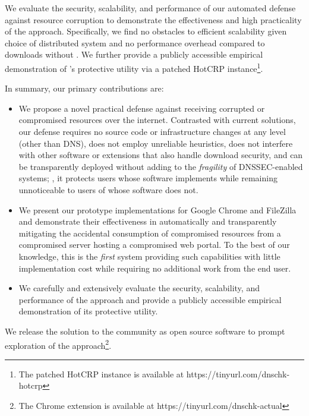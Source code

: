 We evaluate the security, scalability, and performance of our automated defense
against resource corruption to demonstrate the effectiveness and high
practicality of the \SYSTEM{} approach. Specifically, we find no obstacles to
efficient scalability given choice of distributed system and no performance
overhead compared to downloads without \SYSTEM{}. We further provide a publicly
accessible empirical demonstration of \SYSTEM{}'s protective utility via a
patched HotCRP instance\footnote{The patched HotCRP instance is available at
https://tinyurl.com/dnschk-hotcrp}.

In summary, our primary contributions are:

\begin{itemize}

  \item We propose a novel practical defense against receiving corrupted or
  compromised resources over the internet. Contrasted with current solutions,
  our defense requires no source code or infrastructure changes at any level
  (other than DNS), does not employ unreliable heuristics, does not interfere
  with other software or extensions that also handle download security, and can
  be transparently deployed without adding to the \textit{fragility} of
  DNSSEC-enabled systems; \ie, it protects users whose software implements
  \SYSTEM{} while remaining unnoticeable to users of whose software does not.

  \item We present our prototype \SYSTEM{} implementations for Google Chrome and
  FileZilla and demonstrate their effectiveness in automatically and
  transparently mitigating the accidental consumption of compromised resources
  from a compromised server hosting a compromised web portal. To the best of our
  knowledge, this is the \emph{first} system providing such capabilities with
  little implementation cost while requiring no additional work from the end
  user.

  \item We carefully and extensively evaluate the security, scalability, and
  performance of the \SYSTEM{} approach and provide a publicly accessible
  empirical demonstration of its protective utility.

\end{itemize}

We release the \SYSTEM{} solution to the community as open source software to
prompt exploration of the \SYSTEM{} approach\footnote{The \SYSTEM{} Chrome
extension is available at https://tinyurl.com/dnschk-actual}.
